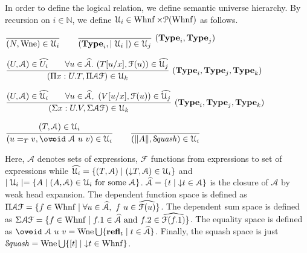 \documentclass[a4paper,english]{lipics-utf8x}
\begin{document}

  In order to define the logical relation, we define semantic universe
  hierarchy.
  By recursion on $i \in \mathbb{N}$, we define
  $\mathcal{U}_i \in \operatorname{Whnf} \times \mathcal{P}(\operatorname{Whnf})$ as follows.

  \begin{center}
  \(
    \ru{}{(N, \Wne) \in \U_i}
    \qquad
    \rux{}{(\Type_i, \mid \U_i \mid) \in \U_j}{(\Type_i,\Type_j)}
  \)
  \end{center}

  \begin{center}
  \(
    \rux{(U, \mathcal{A}) \in \widehat{U_i} \qquad
         \forall u \in \widehat{\mathcal{A}}.\ (T[u/x],\mathcal{F}(u)) \in
         \widehat{\U_j}
       }{(\Pi x:U.T, \Pi \mathcal{A} \mathcal{F}) \in \U_k
       }{(\Type_i, \Type_j, \Type_k)}
  \)
  \end{center}

  \begin{center}
  \(
    \rux{(U, \mathcal{A}) \in \widehat{\U_i} \qquad
        \forall u \in \widehat{\mathcal{A}},\ (V[u/x], \mathcal{F}(u)) \in
        \widehat{\U_j}
       }{(\Sigma x:U.V, \Sigma \mathcal{A} \mathcal{F}) \in \U_k
       }{(\Type_i, \Type_j, \Type_k)}
  \)
  \end{center}

  \begin{center}
  \(
    \ru{(T,\mathcal{A}) \in \U_i
      }{(u =_T v, \oeq\ \mathcal{A}\ u\ v) \in \U_i}
    \qquad
    \ru{}{(\squash{A}, \Squash) \in \U_i}
  \)
  \end{center}

  \noindent %
  Here, $\mathcal{A}$ denotes sets of expressions, $\mathcal{F}$ functions from
  expressions to set of expressions while
  $\widehat{\mathcal{U}_i} = \{ (T,\mathcal{A}) \mid ({\downarrow} T, \mathcal{A}) \in \mathcal{U}_i \}$
  and $\mid \mathcal{U}_i \mid = \{ A \mid (A, \mathcal{A}) \in \mathcal{U}_i \text{ for some }
  \mathcal{A} \}$.
  $\widehat{\mathcal{A}} = \{ t \mid {\downarrow} t \in \mathcal{A} \}$ is the closure
  of $\mathcal{A}$ by weak head expansion.
  The dependent function space is defined as
  $\Pi \mathcal{A} \mathcal{F} = \{ f \in \operatorname{Whnf} \mid \forall u \in
  \widehat{\mathcal{A}},\ f~u \in \widehat{\mathcal{F}(u)} \}$.
  The dependent sum space is defined as
  $\Sigma \mathcal{A} \mathcal{F} = \{ f \in \operatorname{Whnf} \mid f.1 \in
  \widehat{\mathcal{A}} \text{ and } f.2 \in \widehat{\mathcal{F}(f.1)} \}$.
  The equality space is defined as
  $\oeq\ \mathcal{A}\ u\ v = \Wne \bigcup \{ \refl_t \mid t \in
  \widehat{\mathcal{A}} \}$.
  Finally, the squash space is just
  $\operatorname{\mathcal{S}\!\mathit{quash}} = \operatorname{Wne} \bigcup \{ [t] \mid {\downarrow} t \in \operatorname{Whnf} \}$.
\end{document}
